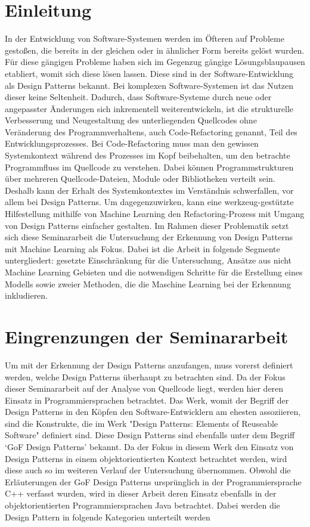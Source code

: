 \documentclass[conference]{IEEEtran}
\begin{document}
\section{Einleitung}
In der Entwicklung von Software-Systemen werden im Öfteren auf Probleme gestoßen, die bereits in der gleichen oder in ähnlicher Form bereits gelöst wurden. Für diese gängigen Probleme haben sich im Gegenzug gängige Lösungsblaupausen etabliert, womit sich diese lösen lassen. Diese sind in der Software-Entwicklung als Design Patterns bekannt.
Bei komplexen Software-Systemen ist das Nutzen dieser keine Seltenheit.
Dadurch, dass Software-Systeme durch neue oder angepasster Änderungen sich inkrementell weiterentwickeln, ist die strukturelle Verbesserung und Neugestaltung des unterliegenden Quellcodes ohne Veränderung des Programmverhaltens, auch Code-Refactoring genannt, Teil des Entwicklungsprozesses.
Bei Code-Refactoring muss man den gewissen Systemkontext während des Prozesses im Kopf beibehalten, um den betrachte Programmfluss im Quellcode zu verstehen.
Dabei können Programmstrukturen über mehreren Quellcode-Dateien, Module oder Bibliotheken verteilt sein. Deshalb kann der Erhalt des Systemkontextes im Verständnis schwerfallen, vor allem bei Design Patterns. Um dagegenzuwirken, kann eine werkzeug-gestützte Hilfestellung mithilfe von Machine Learning den Refactoring-Prozess mit Umgang von Design Patterns einfacher gestalten.
Im Rahmen dieser Problematik setzt sich diese Seminararbeit die Untersuchung der Erkennung von Design Patterns mit Machine Learning als Fokus. Dabei ist die Arbeit in folgende Segmente untergliedert: gesetzte Einschränkung für die Untersuchung, Ansätze aus nicht Machine Learning Gebieten und die notwendigen Schritte für die Erstellung eines Modells sowie zweier Methoden, die die Maschine Learning bei der Erkennung inkludieren.


\section{Eingrenzungen der Seminararbeit}
Um mit der Erkennung der Design Patterns anzufangen, muss vorerst definiert werden, welche Design Patterns überhaupt zu betrachten sind. Da der Fokus dieser Seminararbeit auf der Analyse von Quellcode liegt, werden hier deren Einsatz in Programmiersprachen betrachtet.
Das Werk, womit der Begriff der Design Patterns in den Köpfen den Software-Entwicklern am ehesten assoziieren, sind die Konstrukte, die im Werk "Design Patterns: Elements of Reuseable Software" definiert \cite{gamma1994design} sind. Diese Design Patterns sind ebenfalls unter dem Begriff `GoF Design Patterns' bekannt. Da der Fokus in diesem Werk den Einsatz von Design Patterns in einem
objektorientierten Kontext betrachtet werden, wird diese auch so im weiteren Verlauf der Untersuchung übernommen. Obwohl die Erläuterungen der GoF Design Patterns ursprünglich in der Programmiersprache C++ verfasst wurden, wird in dieser Arbeit deren Einsatz ebenfalls in der objektorientierten Programmiersprachen Java betrachtet.
Dabei werden die Design Pattern in folgende Kategorien unterteilt werden \cite[p. 5797]{Yarahmadi2020}
\end{document}
